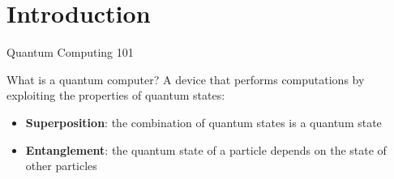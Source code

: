 \section{Introduction}
\begin{frame}
    \sectionpage
\end{frame}

\begin{frame}{Quantum Computing 101}
    \begin{block}{What is a quantum computer?}
        A device that performs computations by exploiting the properties of quantum states:
        \begin{itemize}
            \item \textbf{Superposition}: the combination of quantum states is a quantum state
            \item \textbf{Entanglement}: the quantum state of a particle depends on the state of other particles
        \end{itemize}
    \end{block}
\end{frame}

